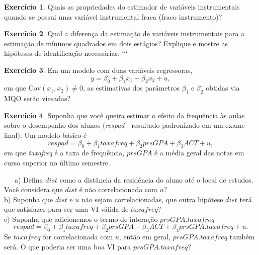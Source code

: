 \documentclass[
]{book}
\theoremstyle{definition}
\theoremstyle{definition}
\theoremstyle{definition}
\newtheorem{exercise}{Exercício}[chapter]
\theoremstyle{remark}
\begin{document}
\begin{exercise}
\protect\hypertarget{exr:exvi6}{}{\label{exr:exvi6} }Quais as propriedades do estimador de variáveis instrumentais quando se possui uma variável instrumental fraca (fraco instrumento)?
\end{exercise}

\begin{exercise}
\protect\hypertarget{exr:exvi7}{}{\label{exr:exvi7} }Qual a diferença da estimação de variáveis instrumentais para a estimação de mínimos quadrados em dois estágios? Explique e mostre as hipóteses de identificação necessárias. ```
\end{exercise}
\begin{exercise}
\protect\hypertarget{exr:exvi8}{}{\label{exr:exvi8} }Em um modelo com duas variáveis regressoras,
\[y=\beta_0+\beta_1x_1+\beta_2x_2+u,\]
em que \(\mbox{Cov}(x_1,x_2)\neq 0\), as estimativas dos parâmetros \(\beta_1\) e \(\beta_2\) obtidas via MQO serão viesadas?
\end{exercise}

\begin{exercise}
\protect\hypertarget{exr:exvi9}{}{\label{exr:exvi9} }Suponha que você queira estimar o efeito da frequência às aulas sobre o desempenho dos alunos (\emph{respad} - resultado padronizado em um exame final).
Um modelo básico é
\[respad=\beta_0+\beta_1taxafreq+\beta_2prsGPA+\beta_3ACT+u,\] em que
\emph{taxafreq} é a taxa de frequência, \(prsGPA\) é a média geral das notas em curso superior no último semestre.

~~~a) Defina \(dist\) como a distância da residência do aluno até o local de estudos. Você considera que \(dist\) é não correlacionada com \(u\)?\\
\hspace*{0.333em}\hspace*{0.333em}\hspace*{0.333em}b) Suponha que \(dist\) e \(u\) não sejam correlacionadas, que outra hipótese \(dist\) terá que satisfazer para ser uma VI válida de \(taxafreq\)?\\
\hspace*{0.333em}\hspace*{0.333em}\hspace*{0.333em}c) Suponha que adicionemos o termo de interação \(prsGPA.taxafreq\) \[respad=\beta_0+\beta_1taxafreq+\beta_2prsGPA+\beta_3ACT+\beta_4 prsGPA.taxafreq+u.\] Se \(taxafreq\) for correlacionada com \(u\), então em geral, \(prsGPA.taxafreq\) também será. O que poderia ser uma boa VI para \(prsGPA.taxafreq\)?
\end{exercise}
\end{document}
